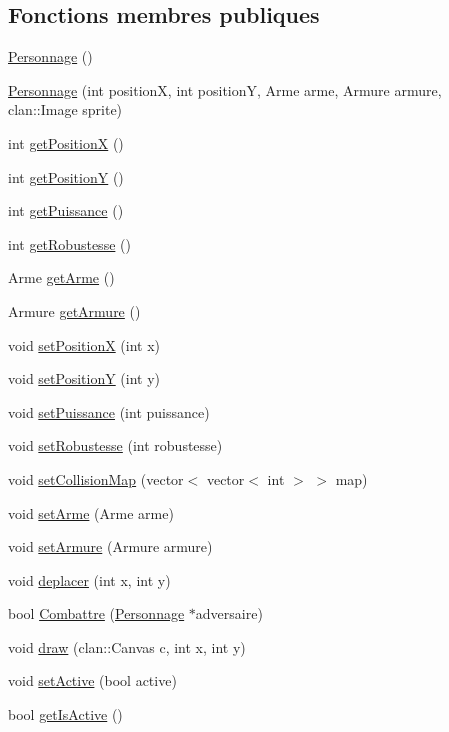 \subsection*{Fonctions membres publiques}
\begin{DoxyCompactItemize}
\item 
\hyperlink{classPersonnage_abec36eb0310adc71f3375297fc590c65}{Personnage} ()
\item 
\hyperlink{classPersonnage_a35385ac425d6818de9dec2d8128004a8}{Personnage} (int position\+X, int position\+Y, Arme arme, Armure armure, clan\+::\+Image sprite)
\item 
int \hyperlink{classPersonnage_ab398b805fa9060fc10b5edb00685bbbb}{get\+Position\+X} ()
\item 
int \hyperlink{classPersonnage_ab19dcfb269109b0bc74ffe0143a8cda1}{get\+Position\+Y} ()
\item 
int \hyperlink{classPersonnage_ac46ff9c905454f0e3b71097b8f75c5ea}{get\+Puissance} ()
\item 
int \hyperlink{classPersonnage_a80ff0a5dc97749f73b84dd52a4185aa4}{get\+Robustesse} ()
\item 
Arme \hyperlink{classPersonnage_a5af967c395cfccb901fb44123c373dfa}{get\+Arme} ()
\item 
Armure \hyperlink{classPersonnage_af0ef6f5bf22b2b471efefbd588bf4dd6}{get\+Armure} ()
\item 
void \hyperlink{classPersonnage_ae065b66e67f3a6c5781453a156786d67}{set\+Position\+X} (int x)
\item 
void \hyperlink{classPersonnage_a757454177b4a3bff5fc641ed53824154}{set\+Position\+Y} (int y)
\item 
void \hyperlink{classPersonnage_a21ee83fd23bf612ff4fadc513c78dc94}{set\+Puissance} (int puissance)
\item 
void \hyperlink{classPersonnage_a777c12bd052992cc9ccbf1f6317433c7}{set\+Robustesse} (int robustesse)
\item 
void \hyperlink{classPersonnage_a332229cbb1b8e46808472c48e7c1f3f2}{set\+Collision\+Map} (vector$<$ vector$<$ int $>$ $>$ map)
\item 
void \hyperlink{classPersonnage_a20b675cc63e94015ddced4e7db6d9b56}{set\+Arme} (Arme arme)
\item 
void \hyperlink{classPersonnage_a331e0aeb7190a266cfb879acdd22e83a}{set\+Armure} (Armure armure)
\item 
void \hyperlink{classPersonnage_afc55c03d855c3f6caf71cdb061829a6d}{deplacer} (int x, int y)
\item 
bool \hyperlink{classPersonnage_ab3b895b1830c07d547a36f0827ec9eb4}{Combattre} (\hyperlink{classPersonnage}{Personnage} $\ast$adversaire)
\item 
void \hyperlink{classPersonnage_a745bf0265378d340d7dd6f2a8225421f}{draw} (clan\+::\+Canvas c, int x, int y)
\item 
void \hyperlink{classPersonnage_ab3ce2fb4d37fc9b3bbef43d33910ac2f}{set\+Active} (bool active)
\item 
bool \hyperlink{classPersonnage_a5a95a7603154e30550bd67cf4bd4f990}{get\+Is\+Active} ()
\end{DoxyCompactItemize}
